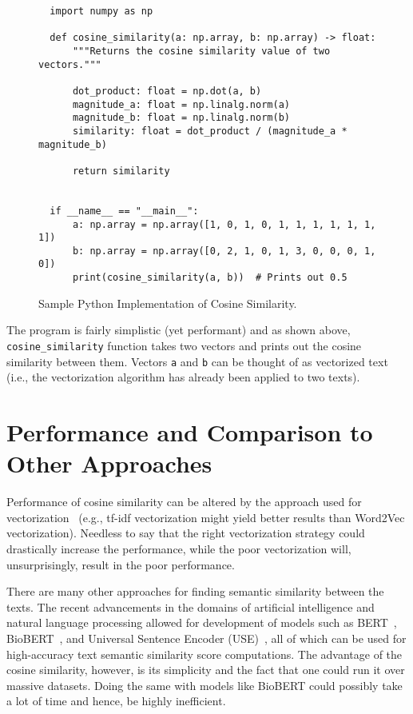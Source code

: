 \documentclass[11pt]{article}
\begin{document}
\begin{figure}[H]
  \begin{verbatim}
  import numpy as np

  def cosine_similarity(a: np.array, b: np.array) -> float:
      """Returns the cosine similarity value of two vectors."""

      dot_product: float = np.dot(a, b)
      magnitude_a: float = np.linalg.norm(a)
      magnitude_b: float = np.linalg.norm(b)
      similarity: float = dot_product / (magnitude_a * magnitude_b)

      return similarity


  if __name__ == "__main__":
      a: np.array = np.array([1, 0, 1, 0, 1, 1, 1, 1, 1, 1, 1])
      b: np.array = np.array([0, 2, 1, 0, 1, 3, 0, 0, 0, 1, 0])
      print(cosine_similarity(a, b))  # Prints out 0.5
  \end{verbatim}
  \caption{Sample Python Implementation of Cosine Similarity.}
\end{figure}

The program is fairly simplistic (yet performant) and as shown above,
\texttt{cosine_similarity} function takes two vectors and prints
out the cosine similarity between them. Vectors \texttt{a} and
\texttt{b} can be thought of as vectorized text (i.e., the
vectorization algorithm has already been applied to two texts).


\section{Performance and Comparison to Other Approaches}

Performance of cosine similarity can be altered by the approach used for
vectorization~\cite{sitikhu2019} (e.g., tf-idf vectorization might yield better
results than Word2Vec vectorization). Needless to say that the right
vectorization strategy could drastically increase the performance, while the
poor vectorization will, unsurprisingly, result in the poor performance.

\medskip

There are many other approaches for finding semantic similarity between the
texts. The recent advancements in the domains of artificial intelligence and
natural language processing allowed for development of models such as
BERT~\cite{turc2019}, BioBERT~\cite{btz682}, and Universal Sentence Encoder
(USE)~\cite{use}, all of which can be used for high-accuracy text semantic
similarity score computations. The advantage of the cosine similarity, however,
is its simplicity and the fact that one could run it over massive datasets.
Doing the same with models like BioBERT could possibly take a lot of time and
hence, be highly inefficient.
\end{document}
